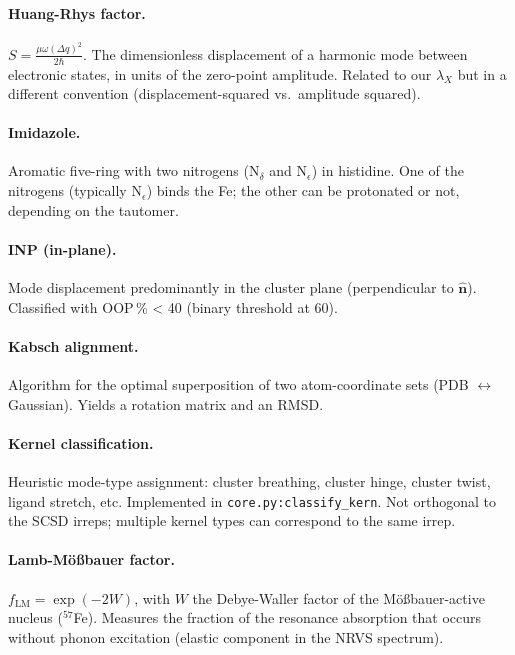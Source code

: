 \documentclass[11pt,a4paper,twoside]{article}
\theoremstyle{remark}
\begin{document}
\paragraph{Huang-Rhys factor.}
$S = \frac{\mu\omega(\Delta q)^2}{2\hbar}$. The dimensionless
displacement of a harmonic mode between electronic states, in
units of the zero-point amplitude. Related to our $\lambda_X$ but
in a different convention (displacement-squared vs.\ amplitude
squared).

\paragraph{Imidazole.}
Aromatic five-ring with two nitrogens (N$_\delta$ and N$_\epsilon$)
in histidine. One of the nitrogens (typically N$_\epsilon$) binds
the Fe; the other can be protonated or not, depending on the
tautomer.

\paragraph{INP (in-plane).}
Mode displacement predominantly in the cluster plane (perpendicular
to $\hat{\mathbf{n}}$). Classified with OOP\,\% < 40 (binary
threshold at 60).

\paragraph{Kabsch alignment.}
Algorithm for the optimal superposition of two atom-coordinate
sets (PDB $\leftrightarrow$ Gaussian). Yields a rotation matrix
and an RMSD.

\paragraph{Kernel classification.}
Heuristic mode-type assignment: cluster breathing, cluster hinge,
cluster twist, ligand stretch, etc. Implemented in
\texttt{core.py:classify\_kern}. Not orthogonal to the SCSD
irreps; multiple kernel types can correspond to the same irrep.

\paragraph{Lamb-M\"o{\ss}bauer factor.}
$f_\text{LM} = \exp(-2W)$, with $W$ the Debye-Waller factor of the
M\"o{\ss}bauer-active nucleus ($^{57}$Fe). Measures the fraction of
the resonance absorption that occurs without phonon excitation
(elastic component in the NRVS spectrum).
\end{document}
